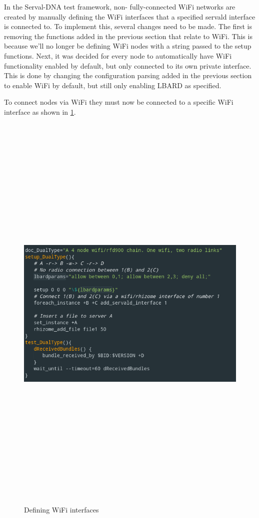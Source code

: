 In the Serval-DNA test framework, non- fully-connected WiFi networks are created by manually defining the WiFi interfaces that a specified servald interface is connected to.
To implement this, several changes need to be made.
The first is removing the functions added in the previous section that relate to WiFi.
This is because we'll no longer be defining WiFi nodes with a string passed to the setup functions.
Next, it was decided for every node to automatically have WiFi functionality enabled by default, but only connected to its own private interface. 
This is done by changing the configuration parsing added in the previous section to enable WiFi by default, but still only enabling LBARD as specified.

To connect nodes via WiFi they must now be connected to a specific WiFi interface as shown in \figurename{ \ref{fig:definingInterfaces}}.

\begin{figure}
    \begin{centering}
        \includegraphics[width=14cm,height=20cm,keepaspectratio]{Figures/definingInterfaces.png}
        \caption{Defining WiFi interfaces}
        \label{fig:definingInterfaces}
    \end{centering}
\end{figure}

